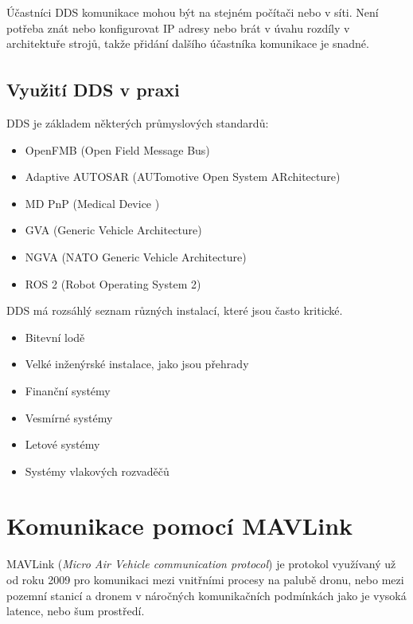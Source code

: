 Účastníci \acs{DDS} komunikace mohou být na stejném počítači nebo v síti. Není potřeba znát nebo konfigurovat IP adresy nebo brát v úvahu rozdíly v architektuře strojů, takže přidání dalšího účastníka komunikace je snadné.

\subsection{Využití DDS\texorpdfstring{\textsuperscript{\textregistered}}{ (R)} v praxi}

\acl{DDS} je základem některých průmyslových standardů: \cite{DDS_usage}

\begin{itemize}
    \item OpenFMB (Open Field Message Bus)
    \item Adaptive AUTOSAR (AUTomotive Open System ARchitecture)
    \item MD PnP (Medical Device )
    \item GVA (Generic Vehicle Architecture)
    \item NGVA (NATO Generic Vehicle Architecture)
    \item ROS 2 (Robot Operating System 2) \\[0.2cm]
\end{itemize}

\acs{DDS} má rozsáhlý seznam různých instalací, které jsou často kritické. \cite{ROS2DDS}

\begin{itemize}
    \item Bitevní lodě
    \item Velké inženýrské instalace, jako jsou přehrady
    \item Finanční systémy
    \item Vesmírné systémy
    \item Letové systémy
    \item Systémy vlakových rozvaděčů
\end{itemize}

\section{Komunikace pomocí MAVLink}

MAVLink (\textit{Micro Air Vehicle communication protocol}) je  protokol využívaný už od roku 2009 pro komunikaci mezi vnitřními procesy na palubě dronu, nebo mezi pozemní stanicí a dronem v náročných komunikačních podmínkách jako je vysoká latence, nebo šum prostředí.

